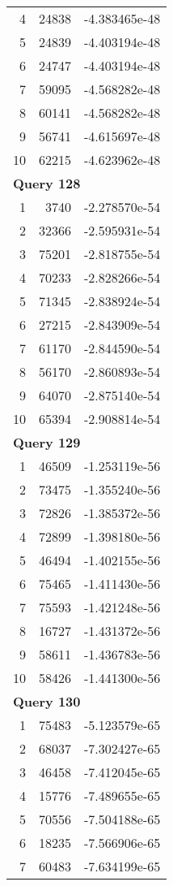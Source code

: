 \begin{longtable}[{p}]{@{}rrp{}@{}}
4 & 24838 & -4.383465e-48 \\
5 & 24839 & -4.403194e-48 \\
6 & 24747 & -4.403194e-48 \\
7 & 59095 & -4.568282e-48 \\
8 & 60141 & -4.568282e-48 \\
9 & 56741 & -4.615697e-48 \\
10 & 62215 & -4.623962e-48 \\
\midrule
\multicolumn{3}{l}{\bfseries Query 128} \\
1 & 3740 & -2.278570e-54 \\
2 & 32366 & -2.595931e-54 \\
3 & 75201 & -2.818755e-54 \\
4 & 70233 & -2.828266e-54 \\
5 & 71345 & -2.838924e-54 \\
6 & 27215 & -2.843909e-54 \\
7 & 61170 & -2.844590e-54 \\
8 & 56170 & -2.860893e-54 \\
9 & 64070 & -2.875140e-54 \\
10 & 65394 & -2.908814e-54 \\
\midrule
\multicolumn{3}{l}{\bfseries Query 129} \\
1 & 46509 & -1.253119e-56 \\
2 & 73475 & -1.355240e-56 \\
3 & 72826 & -1.385372e-56 \\
4 & 72899 & -1.398180e-56 \\
5 & 46494 & -1.402155e-56 \\
6 & 75465 & -1.411430e-56 \\
7 & 75593 & -1.421248e-56 \\
8 & 16727 & -1.431372e-56 \\
9 & 58611 & -1.436783e-56 \\
10 & 58426 & -1.441300e-56 \\
\midrule
\multicolumn{3}{l}{\bfseries Query 130} \\
1 & 75483 & -5.123579e-65 \\
2 & 68037 & -7.302427e-65 \\
3 & 46458 & -7.412045e-65 \\
4 & 15776 & -7.489655e-65 \\
5 & 70556 & -7.504188e-65 \\
6 & 18235 & -7.566906e-65 \\
7 & 60483 & -7.634199e-65 \\

\end{longtable}
